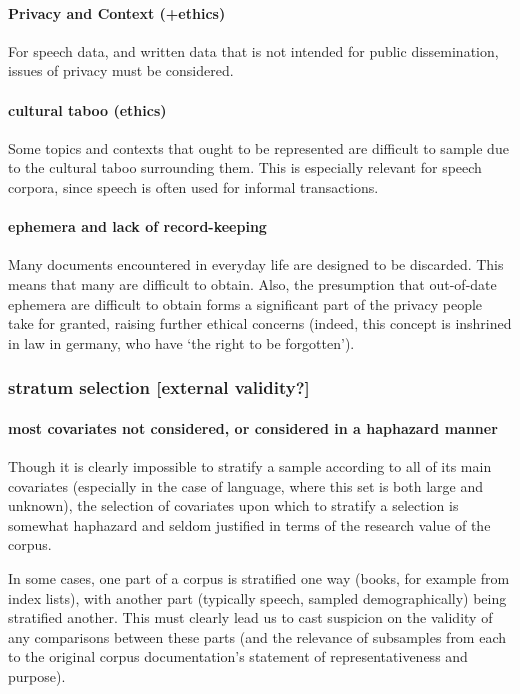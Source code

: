 \paragraph{Privacy and Context (+ethics)}
For speech data, and written data that is not intended for public dissemination, issues of privacy must be considered.



\paragraph{ cultural taboo (ethics)}
Some topics and contexts that ought to be represented are difficult to sample due to the cultural taboo surrounding them. This is especially relevant for speech corpora, since speech is often used for informal transactions.


\paragraph{ ephemera and lack of record-keeping}
Many documents encountered in everyday life are designed to be discarded. This means that many are difficult to obtain. Also, the presumption that out-of-date ephemera are difficult to obtain forms a significant part of the privacy people take for granted, raising further ethical concerns (indeed, this concept is inshrined in law in germany, who have `the right to be forgotten').


\subsubsection{stratum selection [external validity?]}

\paragraph{ most covariates not considered, or considered in a haphazard manner}
Though it is clearly impossible to stratify a sample according to all of its main covariates (especially in the case of language, where this set is both large and unknown), the selection of covariates upon which to stratify a selection is somewhat haphazard and seldom justified in terms of the research value of the corpus.

In some cases, one part of a corpus is stratified one way (books, for example from index lists), with another part (typically speech, sampled demographically) being stratified another. This must clearly lead us to cast suspicion on the validity of any comparisons between these parts (and the relevance of subsamples from each to the original corpus documentation's statement of representativeness and purpose).

